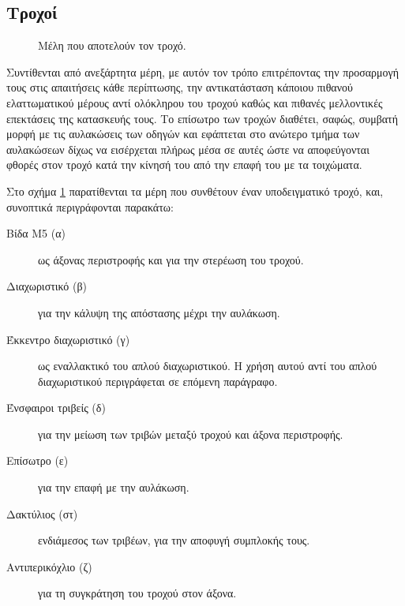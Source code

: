 \subsection{Τροχοί}

\begin{figure}
    \caption{Μέλη που αποτελούν τον τροχό.\label{fig:construct:wheel_exploded}}
    \begin{center}%
    \def\svgwidth{0.8\textwidth}
    
    \end{center}
\end{figure}

Συντίθενται από ανεξάρτητα μέρη, με αυτόν τον τρόπο επιτρέποντας την προσαρμογή
τους στις απαιτήσεις κάθε περίπτωσης, την αντικατάσταση κάποιου πιθανού
ελαττωματικού μέρους αντί ολόκληρου του τροχού καθώς και πιθανές μελλοντικές
επεκτάσεις της κατασκευής τους.
Το επίσωτρο των τροχών διαθέτει, σαφώς, συμβατή μορφή με τις αυλακώσεις των
οδηγών και εφάπτεται στο ανώτερο τμήμα των αυλακώσεων δίχως να εισέρχεται πλήρως
μέσα σε αυτές ώστε να αποφεύγονται φθορές στον τροχό κατά την κίνησή του από την
επαφή του με τα τοιχώματα.

Στο σχήμα \ref{fig:construct:wheel_exploded} παρατίθενται τα μέρη που συνθέτουν
έναν υποδειγματικό τροχό, και, συνοπτικά περιγράφονται παρακάτω:
\begin{flushleft}
\begin{description}
    \item[Βίδα M5 (α)] ως άξονας περιστροφής και για την στερέωση του τροχού.
    \item[Διαχωριστικό (β)] για την κάλυψη της απόστασης μέχρι την αυλάκωση.
    \item[Έκκεντρο διαχωριστικό (γ)] ως εναλλακτικό του απλού διαχωριστικού. Η
    χρήση αυτού αντί του απλού διαχωριστικού περιγράφεται σε επόμενη παράγραφο.
    \item[Ένσφαιροι τριβείς (δ)] για την μείωση των τριβών μεταξύ τροχού και
    άξονα περιστροφής.
    \item[Επίσωτρο (ε)] για την επαφή με την αυλάκωση.
    \item[Δακτύλιος (στ)] ενδιάμεσος των τριβέων, για την αποφυγή συμπλοκής
    τους.
    \item[Αντιπερικόχλιο (ζ)] για τη συγκράτηση του τροχού στον άξονα.
\end{description}
\end{flushleft}

